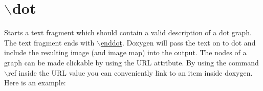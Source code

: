  \hypertarget{commands_cmddot}{}\section{$\backslash$dot}\label{commands_cmddot}
 Starts a text fragment which should contain a valid description of a dot graph. The text fragment ends with \hyperlink{commands_cmdenddot}{$\backslash$enddot}. Doxygen will pass the text on to dot and include the resulting image (and image map) into the output. The nodes of a graph can be made clickable by using the URL attribute. By using the command $\backslash$ref inside the URL value you can conveniently link to an item inside doxygen. Here is an example: 




